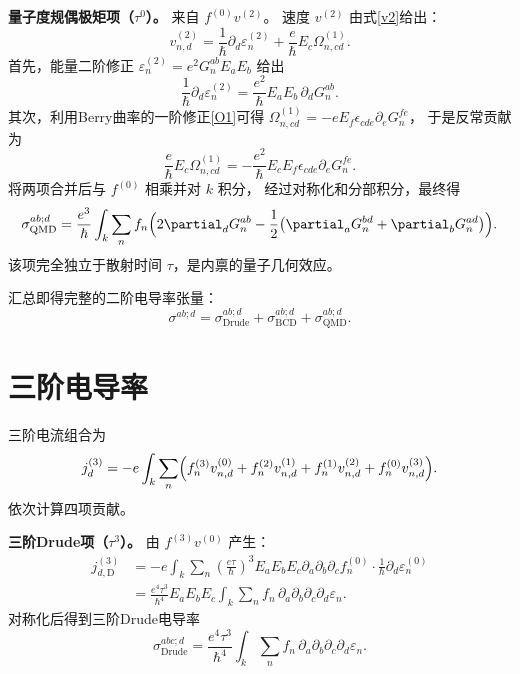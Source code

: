 \textbf{量子度规偶极矩项（\(\tau^0\)）。} 来自 \(f^{(0)}v^{(2)}\)。
速度 \(v^{(2)}\) 由式\eqref{v2}给出：
\begin{equation}
  v_{n,d}^{(2)}
  = \frac{1}{\hbar}\partial_d\varepsilon_n^{(2)}
    + \frac{e}{\hbar} E_c \Omega_{n,cd}^{(1)} .
\end{equation}
首先，能量二阶修正 \(\varepsilon_n^{(2)} = e^2 G_n^{ab} E_a E_b\) 给出
\begin{equation}
  \frac{1}{\hbar}\partial_d\varepsilon_n^{(2)}
  = \frac{e^2}{\hbar} E_a E_b \,\partial_d G_n^{ab}.
\end{equation}
其次，利用Berry曲率的一阶修正\eqref{O1}可得
\(\Omega_{n,cd}^{(1)} = -e E_f \epsilon_{cde}\partial_e G_n^{f\!e}\)，
于是反常贡献为
\begin{equation}
  \frac{e}{\hbar} E_c \Omega_{n,cd}^{(1)}
  = -\frac{e^2}{\hbar} E_c E_f \epsilon_{cde}\partial_e G_n^{f\!e}.
\end{equation}
将两项合并后与 \(f^{(0)}\) 相乘并对 \(k\) 积分，
经过对称化和分部积分，最终得
\begin{equation}
  \sigma_{\text{QMD}}^{ab;d} =
  \frac{e^3}{\hbar} \int_k\sum_n f_n \Bigl(
    2\partial_d G_n^{ab}
    - \frac12\bigl( \partial_a G_n^{bd} + \partial_b G_n^{ad} \bigr)
  \Bigr).
  \label{s2_QMD}
\end{equation}
该项完全独立于散射时间 \(\tau\)，是内禀的量子几何效应。

汇总即得完整的二阶电导率张量：
\begin{equation}
  \sigma^{ab;d}
  = \sigma_{\text{Drude}}^{ab;d}
  + \sigma_{\text{BCD}}^{ab;d}
  + \sigma_{\text{QMD}}^{ab;d}.
  \label{sigma2_total}
\end{equation}

\section{三阶电导率}

三阶电流组合为
\begin{equation}
  j_d^{(3)} = -e\int_k\sum_n \Bigl(
    f_n^{(3)} v_{n,d}^{(0)}
  + f_n^{(2)} v_{n,d}^{(1)}
  + f_n^{(1)} v_{n,d}^{(2)}
  + f_n^{(0)} v_{n,d}^{(3)}
  \Bigr).
  \label{j3}
\end{equation}
依次计算四项贡献。

\textbf{三阶Drude项（\(\tau^3\)）。} 由 \(f^{(3)}v^{(0)}\) 产生：
\begin{align}
  j_{d,\text{D}}^{(3)}
  &= -e\int_k\sum_n
    \left(\frac{e\tau}{\hbar}\right)^3 E_a E_b E_c
    \partial_a\partial_b\partial_c f_n^{(0)}
    \cdot \frac{1}{\hbar}\partial_d\varepsilon_n^{(0)} \nonumber\\
  &= \frac{e^4\tau^3}{\hbar^4} E_a E_b E_c
    \int_k\sum_n f_n \,
    \partial_a\partial_b\partial_c\partial_d\varepsilon_n .
\end{align}
对称化后得到三阶Drude电导率
\begin{equation}
  \sigma_{\text{Drude}}^{abc;d} =
  \frac{e^4\tau^3}{\hbar^4} \int_k\sum_n f_n \,
  \partial_a\partial_b\partial_c\partial_d\varepsilon_n .
  \label{s3_D}
\end{equation}

